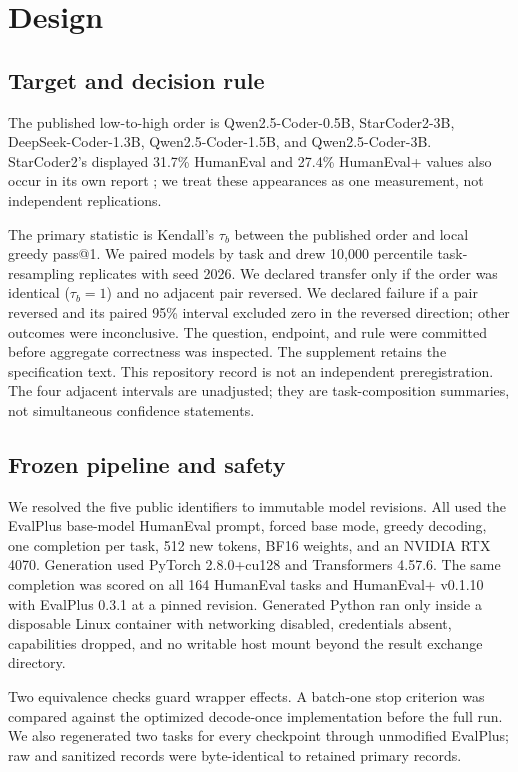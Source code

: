 \documentclass[10pt,conference]{IEEEtran}
\begin{document}
\section{Design}
\subsection{Target and decision rule}
The published low-to-high order is Qwen2.5-Coder-0.5B, StarCoder2-3B,
DeepSeek-Coder-1.3B, Qwen2.5-Coder-1.5B, and Qwen2.5-Coder-3B. StarCoder2's
displayed 31.7\% HumanEval and 27.4\% HumanEval+ values also occur in its own
report \cite{lozhkov2024starcoder2}; we treat these appearances as one
measurement, not independent replications.

The primary statistic is Kendall's $\tau_b$ between the published order and
local greedy pass@1. We paired models by task and drew 10,000 percentile
task-resampling replicates with seed 2026. We declared transfer only if the
order was identical ($\tau_b=1$) and no adjacent pair reversed. We declared
failure if a pair reversed and its paired 95\% interval excluded zero in the
reversed direction; other outcomes were inconclusive. The question, endpoint,
and rule were committed before aggregate correctness was inspected.
The supplement retains the specification text. This repository record is not
an independent preregistration. The four adjacent intervals are unadjusted;
they are task-composition summaries, not simultaneous confidence statements.

\subsection{Frozen pipeline and safety}
We resolved the five public identifiers to immutable model revisions. All used
the EvalPlus base-model HumanEval prompt, forced base mode, greedy decoding,
one completion per task, 512 new tokens, BF16 weights, and an NVIDIA RTX 4070.
Generation used PyTorch 2.8.0+cu128 and Transformers 4.57.6. The same completion
was scored on all 164 HumanEval tasks and HumanEval+ v0.1.10 with EvalPlus 0.3.1
at a pinned revision. Generated Python ran only inside a disposable Linux
container with networking disabled, credentials absent, capabilities dropped,
and no writable host mount beyond the result exchange directory.

Two equivalence checks guard wrapper effects. A batch-one stop criterion was
compared against the optimized decode-once implementation before the full run.
We also regenerated two tasks for every checkpoint through unmodified EvalPlus;
raw and sanitized records were byte-identical to retained primary records.
\end{document}
